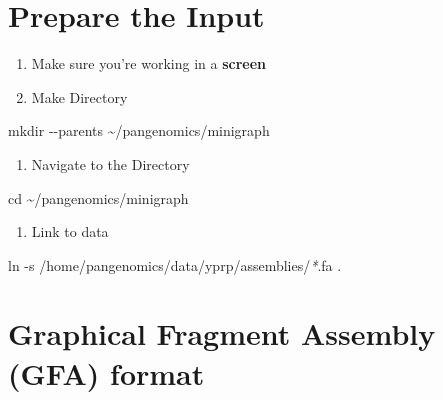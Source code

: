 \documentclass[
]{book}
\newenvironment{Shaded}{\begin{snugshade}}{\end{snugshade}}
\newcommand{\AttributeTok}[1]{\textcolor[rgb]{0.77,0.63,0.00}{#1}}
\newcommand{\BuiltInTok}[1]{#1}
\newcommand{\FunctionTok}[1]{\textcolor[rgb]{0.00,0.00,0.00}{#1}}
\newcommand{\NormalTok}[1]{#1}
\newcommand{\PreprocessorTok}[1]{\textcolor[rgb]{0.56,0.35,0.01}{\textit{#1}}}
\providecommand{\tightlist}{%
  \setlength{\itemsep}{0pt}\setlength{\parskip}{0pt}}
\begin{document}
\hypertarget{prepare-the-input}{%
\section{Prepare the Input}\label{prepare-the-input}}

\begin{enumerate}
\def\labelenumi{\arabic{enumi}.}
\item
  Make sure you're working in a \textbf{screen}
\item
  Make Directory
\end{enumerate}

\begin{Shaded}
\begin{Highlighting}[]
\FunctionTok{mkdir} \AttributeTok{{-}{-}parents}\NormalTok{ \textasciitilde{}/pangenomics/minigraph}
\end{Highlighting}
\end{Shaded}

\begin{enumerate}
\def\labelenumi{\arabic{enumi}.}
\setcounter{enumi}{2}
\tightlist
\item
  Navigate to the Directory
\end{enumerate}

\begin{Shaded}
\begin{Highlighting}[]
\BuiltInTok{cd}\NormalTok{ \textasciitilde{}/pangenomics/minigraph}
\end{Highlighting}
\end{Shaded}

\begin{enumerate}
\def\labelenumi{\arabic{enumi}.}
\setcounter{enumi}{3}
\tightlist
\item
  Link to data
\end{enumerate}

\begin{Shaded}
\begin{Highlighting}[]
\FunctionTok{ln} \AttributeTok{{-}s}\NormalTok{ /home/pangenomics/data/yprp/assemblies/}\PreprocessorTok{*}\NormalTok{.fa .}
\end{Highlighting}
\end{Shaded}

\hypertarget{graphical-fragment-assembly-gfa-format-1}{%
\section{Graphical Fragment Assembly (GFA) format}\label{graphical-fragment-assembly-gfa-format-1}}
\end{document}
